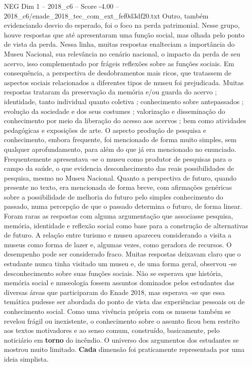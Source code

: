 \begin{textsample}{NEG Dim 1 – 2018\_c6 – Score -4.00 – 2018\_c6/enade\_2018\_tec\_com\_ext\_fef0d3df20.txt}
Outro, também evidenciando desvio do esperado, foi o foco na perda patrimonial.
Nesse grupo, houve respostas que até apresentaram uma função social, mas olhada pelo ponto de vista da perda.
Nessa linha, muitas respostas enalteciam a importância do Museu Nacional, sua relevância no cenário nacional, o impacto da perda de seu acervo, isso complementado por frágeis reflexões sobre as funções sociais.
Em consequência, a perspectiva de desdobramentos mais ricos, que tratassem de aspectos sociais relacionados a diferentes tipos de museu foi prejudicada.
Muitas respostas trataram da preservação da memória e/ou guarda do acervo ; identidade, tanto individual quanto coletiva ; conhecimento sobre antepassados ; evolução da sociedade e dos seus costumes ; valorização e disseminação do conhecimento por meio da liberação do acesso aos acervos ; bem como atividades pedagógicas e exposições de arte.
O aspecto produção de pesquisa e conhecimento, embora frequente, foi mencionado de forma muito simples, sem qualquer aprofundamento, para além do que já era mencionado no enunciado.
Frequentemente apresentava -se o museu como produtor de pesquisas para o campo da saúde, o que evidencia desconhecimento das reais possibilidades de pesquisa, mesmo no Museu Nacional.
Quanto a perspectiva de futuro, quando presente no texto, era mencionada de forma breve, com afirmações genéricas sobre a possibilidade de melhoria do futuro pelo simples conhecimento do passado, numa percepção de que o passado determina o futuro, de forma linear.
Foram raras as respostas com alguma argumentação que associasse pesquisa, memória, identidade e reflexão social como base para a construção de alternativas de futuro.
A relação entre turismo e museu apareceu considerando a visita a museus como forma de lazer e, algumas vezes, como geradora de recursos.
O desempenho pode ser considerado fraco.
Muitas respostas deixavam claro que o estudante nunca tinha visitado um museu e, de uma forma geral, observou -se desconhecimento sobre suas funções sociais.
Não se esperava que história, memória social e museologia fossem assuntos dominados pelos estudantes das diversas áreas que participaram do Enade 2018, mas esperava -se que essa temática pudesse ser abordada do ponto de vista das experiências pessoais ou de conhecimento social.
Como uma vivência própria com os museus também se revelou frágil ou inexistente, o conhecimento sobre o assunto ficou bem restrito aos textos motivadores e ao senso comum, construído, basicamente, pelo noticiário em \textbf{torno} do incêndio.
O universo dos argumentos dos estudantes se mostrou muito limitado. \textbf{Cada} dimensão foi praticamente representada por uma ideia simplista.

\end{textsample}
